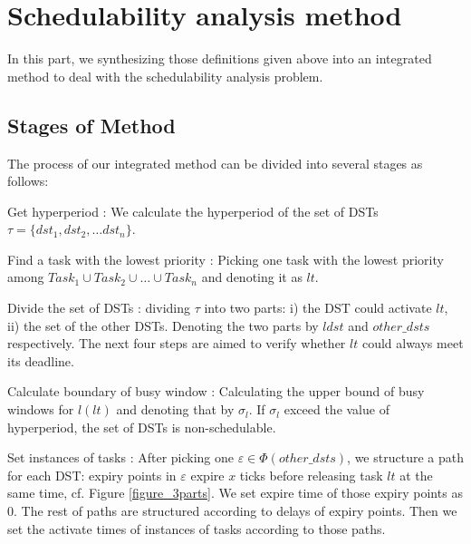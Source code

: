 \documentclass[sigconf]{acmart}
\begin{document}
\section{Schedulability analysis method}
In this part, we synthesizing those definitions given above into an integrated method to deal with the schedulability analysis problem.

\subsection{Stages of Method}\label{section_8steps}
The process of our integrated method can be divided into several stages as follows:
\begin{compactdesc}
  \item[Get hyperperiod]: We calculate the hyperperiod of the set of DSTs $\tau=\{dst_1,dst_2, \dots dst_n\}$.

  \item[Find a task with the lowest priority]: Picking one task with the lowest priority among $Task_1\cup Task_2\cup\dots\cup Task_n$ and denoting it as $lt$. 
  \item[Divide the set of DSTs]: dividing $\tau$ into two parts: i) the DST could activate $lt$, ii) the set of the other DSTs. Denoting the two parts by $ldst$ and $other\_dsts$ respectively. The next four steps are aimed to verify whether $lt$ could always meet its deadline. 

  \item[Calculate boundary of busy window]: Calculating the upper bound of busy windows for $l(lt)$ and denoting that by $\sigma_l$. If $\sigma_l$ exceed the value of hyperperiod, the set of DSTs is non-schedulable.
  
  \item[Set instances of tasks]: After picking one $\varepsilon\in\Phi(other\_dsts)$, we structure a path for each DST: expiry points in $\varepsilon$ expire $x$ ticks before releasing task $lt$ at the same time, cf. Figure \ref{figure_3parts}. We set expire time of those expiry points as 0. The rest of paths are structured according to delays of expiry points. Then we set the activate times of instances of tasks according to those paths.


\end{compactdesc}
\end{document}
